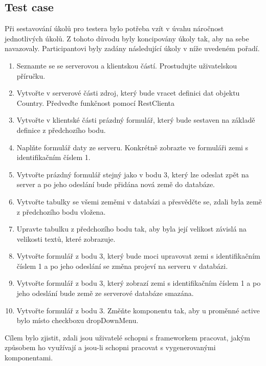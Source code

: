 \subsection{Test case}
Při sestavování úkolů pro testera bylo potřeba vzít v úvahu náročnost jednotlivých úkolů. Z tohoto důvodu byly koncipovány úkoly tak, aby na sebe navazovaly. Participantovi byly zadány následující úkoly v níže uvedeném pořadí.
\begin{enumerate}
\item Seznamte se se serverovou a klientskou částí. Prostudujte uživatelskou příručku.
\item Vytvořte v serverové části zdroj, který bude vracet definici dat objektu Country. Předveďte funkčnost pomocí RestClienta
\item Vytvořte v klientské části prázdný formulář, který bude sestaven na základě definice z předchozího bodu.
\item Naplňte formulář daty ze serveru. Konkrétně zobrazte ve formuláři zemi s identifikačním číslem 1.
\item Vytvořte prázdný formulář stejný jako v bodu 3, který lze odeslat zpět na server a po jeho odeslání bude přidána nová země do databáze.
\item Vytvořte tabulky se všemi zeměmi v databázi a přesvědčte se, zdali byla země z předchozího bodu vložena.
\item Upravte tabulku z předchozího bodu tak, aby byla její velikost závislá na velikosti textů, které zobrazuje.
\item Vytvořte formulář z bodu 3, který bude moci upravovat zemi s identifikačním číslem 1 a po jeho odeslání se změna projeví na serveru v databázi.
\item Vytvořte formulář z bodu 3, který zobrazí zemi s identifikačním číslem 1 a po jeho odeslání bude země ze serverové databáze smazána.
\item Vytvořte formulář z bodu 3. Změňte komponentu tak, aby u proměnné active bylo místo checkboxu dropDownMenu.
\end{enumerate}
Cílem bylo zjistit, zdali jsou uživatelé schopni s frameworkem pracovat, jakým způsobem ho využívají a jsou-li schopni pracovat s vygenerovanými komponentami.
